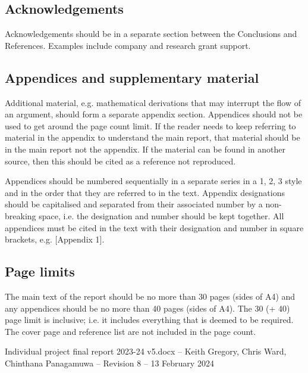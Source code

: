 \documentclass[12pt]{article}
\begin{document}
\hypertarget{acknowledgements}{%
\subsection{\texorpdfstring{
Acknowledgements}{ Acknowledgements}}\label{acknowledgements}}

Acknowledgements should be in a separate section between the Conclusions
and References. Examples include company and research grant support.

\hypertarget{appendices-and-supplementary-material}{%
\subsection{Appendices and supplementary
material}\label{appendices-and-supplementary-material}}

Additional material, e.g. mathematical derivations that may interrupt
the flow of an argument, should form a separate appendix section.
Appendices should not be used to get around the page count limit. If the
reader needs to keep referring to material in the appendix to understand
the main report, that material should be in the main report not the
appendix. If the material can be found in another source, then this
should be cited as a reference not reproduced.

Appendices should be numbered sequentially in a separate series in a 1,
2, 3 style and in the order that they are referred to in the text.
Appendix designations should be capitalised and separated from their
associated number by a non-breaking space, i.e. the designation and
number should be kept together. All appendices must be cited in the text
with their designation and number in square brackets, e.g. {[}Appendix
1{]}.

\hypertarget{page-limits}{%
\subsection{Page limits}\label{page-limits}}

The main text of the report should be no more than 30 pages (sides of
A4) and any appendices should be no more than 40 pages (sides of A4).
The 30 (+ 40) page limit is inclusive; i.e. it includes everything that
is deemed to be required. The cover page and reference list are not
included in the page count.

Individual project final report 2023-24 v5.docx -- Keith Gregory, Chris
Ward, Chinthana Panagamuwa -- Revision 8 -- 13 February 2024



\end{document}
